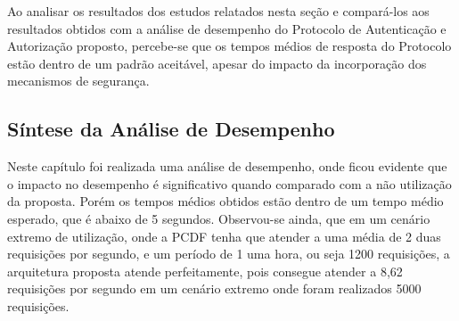 

Ao analisar os resultados dos estudos relatados nesta seção e compará-los aos resultados obtidos com a análise de desempenho do Protocolo de Autenticação e Autorização proposto, percebe-se que os tempos médios de resposta do Protocolo estão dentro de um padrão aceitável, apesar do impacto da incorporação dos mecanismos de segurança.

\subsection{S\'{i}ntese da An\'{a}lise de Desempenho}

Neste cap\'{i}tulo foi realizada uma análise de desempenho, onde ficou evidente que o impacto no desempenho é significativo quando comparado com a não utilização da proposta. Porém os tempos médios obtidos estão dentro de um tempo médio esperado, que é abaixo de 5 segundos. Observou-se ainda, que em um cenário extremo de utilização, onde a PCDF tenha que atender a uma média de 2 duas requisições por segundo, e um período de 1 uma hora, ou seja 1200 requisições, a arquitetura proposta atende perfeitamente, pois consegue atender a 8,62 requisições por segundo em um cenário extremo onde foram realizados 5000 requisições.
